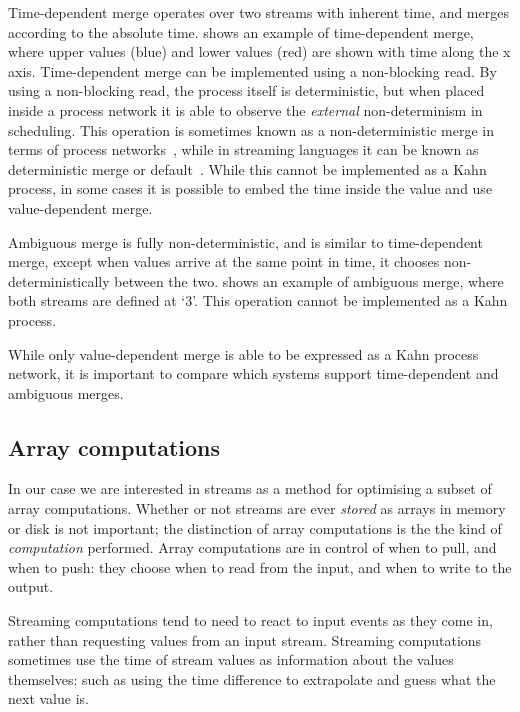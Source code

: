 Time-dependent merge operates over two streams with inherent time, and merges according to the absolute time.
 shows an example of time-dependent merge, where upper values (blue) and lower values (red) are shown with time along the x axis.
Time-dependent merge can be implemented using a non-blocking read.
By using a non-blocking read, the process itself is deterministic, but when placed inside a process network it is able to observe the \emph{external} non-determinism in scheduling.
This operation is sometimes known as a non-deterministic merge in terms of process networks~\citep{brock1981scenarios}, while in streaming languages it can be known as deterministic merge or default~\citep{amagbegnon1995implementation}.
While this cannot be implemented as a Kahn process, in some cases it is possible to embed the time inside the value and use value-dependent merge.


Ambiguous merge is fully non-deterministic, and is similar to time-dependent merge, except when values arrive at the same point in time, it chooses non-deterministically between the two.
 shows an example of ambiguous merge, where both streams are defined at `3'.
This operation cannot be implemented as a Kahn process.

While only value-dependent merge is able to be expressed as a Kahn process network, it is important to compare which systems support time-dependent and ambiguous merges.

\subsection{Array computations}

In our case we are interested in streams as a method for optimising a subset of array computations.
Whether or not streams are ever \emph{stored} as arrays in memory or disk is not important; the distinction of array computations is the the kind of \emph{computation} performed.
Array computations are in control of when to pull, and when to push: they choose when to read from the input, and when to write to the output.

Streaming computations tend to need to react to input events as they come in, rather than requesting values from an input stream.
Streaming computations sometimes use the time of stream values as information about the values themselves: such as using the time difference to extrapolate and guess what the next value is.

